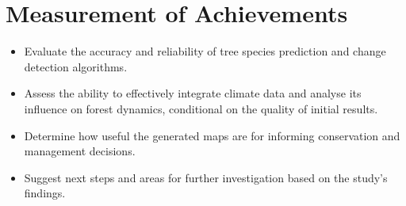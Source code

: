 \section{Measurement of Achievements}

\begin{itemize}
\item Evaluate the accuracy and reliability of tree species prediction and change detection algorithms.
\item Assess the ability to effectively integrate climate data and analyse its influence on forest dynamics, conditional on the quality of initial results.
\item Determine how useful the generated maps are for informing conservation and management decisions.
\item Suggest next steps and areas for further investigation based on the study's findings.
\end{itemize}

